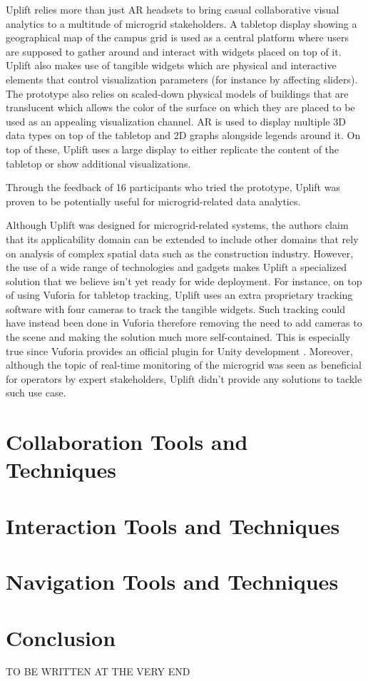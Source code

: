 \documentclass{vgtc}                          %
\begin{document}
\noindent Uplift relies more than just AR headsets to bring casual collaborative visual
analytics to a multitude of microgrid stakeholders. A tabletop display showing
a geographical map of the campus grid is used as a central platform where users
are supposed to gather around and interact with widgets placed on top of it.
Uplift also makes use of tangible
widgets which are physical and interactive elements that control visualization
parameters (for instance by affecting sliders). The prototype also relies on
scaled-down physical models of buildings that are translucent which allows
the color of the surface on which they are placed to be used as an appealing
visualization channel. AR is used to display multiple 3D data types on top of
the tabletop and 2D graphs alongside legends around it. On top of these, Uplift
uses a large display to either replicate the content of the tabletop or show
additional visualizations.

\smallskip

\noindent Through the feedback of 16 participants who tried the prototype, Uplift was
proven to be potentially useful for microgrid-related data analytics.

\smallskip

\noindent Although Uplift was designed for microgrid-related systems,
the authors claim that its applicability domain can be extended to include
other domains that rely on analysis of complex spatial data such as
the construction industry. However, the use of a wide range of technologies
and gadgets makes Uplift a specialized solution that we believe isn't yet
ready for wide deployment. For instance, on top of using Vuforia for tabletop
tracking, Uplift uses an extra proprietary tracking software with four cameras
to track the tangible widgets. Such tracking could have instead been done in
Vuforia therefore removing the need to add cameras to the scene and making the
solution much more self-contained. This is especially true since Vuforia provides
an official plugin for Unity development \cite{unity:vuforia_plugin}.
Moreover, although the topic of real-time monitoring of the microgrid was seen
as beneficial for operators by expert stakeholders, Uplift didn't provide any
solutions to tackle such use case.

\section{Collaboration Tools and Techniques}
\section{Interaction Tools and Techniques}
\section{Navigation Tools and Techniques}

\section{Conclusion}
TO BE WRITTEN AT THE VERY END

\printbibliography
\end{document}
